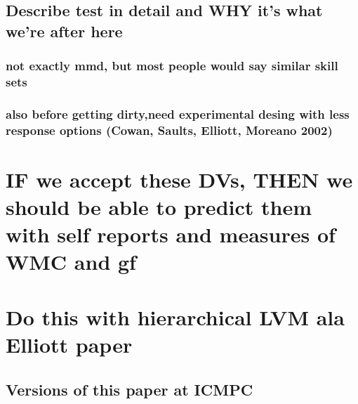 \documentclass[]{book}
\theoremstyle{definition}
\theoremstyle{definition}
\theoremstyle{definition}
\theoremstyle{remark}
\begin{document}
\hypertarget{describe-test-in-detail-and-why-its-what-were-after-here}{%
\subsection{Describe test in detail and WHY it's what we're after
here}\label{describe-test-in-detail-and-why-its-what-were-after-here}}

\hypertarget{not-exactly-mmd-but-most-people-would-say-similar-skill-sets}{%
\subsubsection{not exactly mmd, but most people would say similar skill
sets}\label{not-exactly-mmd-but-most-people-would-say-similar-skill-sets}}

\hypertarget{also-before-getting-dirtyneed-experimental-desing-with-less-response-options-cowan-saults-elliott-moreano-2002}{%
\subsubsection{also before getting dirty,need experimental desing with
less response options (Cowan, Saults, Elliott, Moreano
2002)}\label{also-before-getting-dirtyneed-experimental-desing-with-less-response-options-cowan-saults-elliott-moreano-2002}}

\hypertarget{if-we-accept-these-dvs-then-we-should-be-able-to-predict-them-with-self-reports-and-measures-of-wmc-and-gf}{%
\section{IF we accept these DVs, THEN we should be able to predict them
with self reports and measures of WMC and
gf}\label{if-we-accept-these-dvs-then-we-should-be-able-to-predict-them-with-self-reports-and-measures-of-wmc-and-gf}}

\hypertarget{do-this-with-hierarchical-lvm-ala-elliott-paper}{%
\section{Do this with hierarchical LVM ala Elliott
paper}\label{do-this-with-hierarchical-lvm-ala-elliott-paper}}

\hypertarget{versions-of-this-paper-at-icmpc}{%
\subsection{Versions of this paper at
ICMPC}\label{versions-of-this-paper-at-icmpc}}
\end{document}
